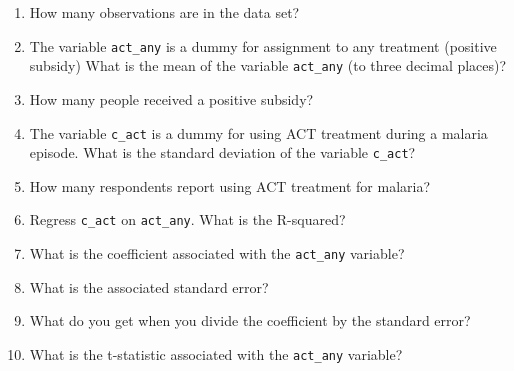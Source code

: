 \documentclass[11pt]{article}
\begin{document}
\begin{enumerate}
	
\item How many observations are in the data set?

\item The variable \texttt{act\_any} is a dummy for assignment to any treatment (positive subsidy) What is the mean of the variable \texttt{act\_any} (to three decimal places)?

\item How many people received a positive subsidy?

\item The variable \texttt{c\_act} is a dummy for using ACT treatment during a malaria episode.  
What is the standard deviation of the variable \texttt{c\_act}?

\item How many respondents report using ACT treatment for malaria?

\item Regress \texttt{c\_act} on \texttt{act\_any}.  What is the R-squared?

\item What is the coefficient associated with the \texttt{act\_any} variable?

\item What is the associated standard error?

\item What do you get when you divide the coefficient by the standard error?

\item What is the t-statistic associated with the \texttt{act\_any} variable?

\end{enumerate}
\end{document}
